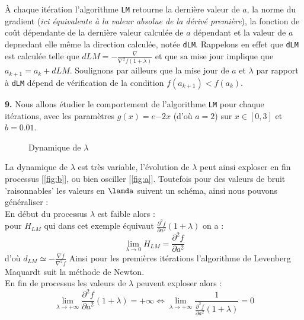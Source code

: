 \documentclass[12pt]{article}
\begin{document}
À chaque itération l'algorithme \verb|LM| retourne la dernière  valeur de  $a$, la norme du gradient (\textit{ici équivalente à la valeur absolue de la dérivé première}), la fonction de coût dépendante de la dernière valeur calculée de $a$ dépendant et la valeur de $a$ depnedant elle même la direction calculée, notée \verb|dLM|. Rappelons en effet que  \verb|dLM|  est calculée telle que $dLM = -\frac{\nabla}{\nabla^2 f (1 + \lambda)}$ et que sa mise jour implique que  $a_{k+1} = a_k +dLM$. Soulignons par ailleurs que la mise jour de $a$ et $\lambda$ par rapport à \verb|dLM| dépend de vérification  de la condition $f(a_{k+1}) < f(a_k)$.

\textbf{\color{brick}9.} Nous allons étudier le comportement de l'algorithme \verb|LM| pour chaque itérations, avec les paramètres $g(x)= e{-2x}$ (d'où $a=2$) sur $x \in [0,3]$ et $b=0.01$.

\begin{figure}
  \centering
  \caption{Dynamique de $\lambda$}
  \label{fig:ab}
\end{figure}




La dynamique de $\lambda$ est très variable, l'évolution de $\lambda$ peut ainsi exploser en fin processus [\ref{fig:b}], ou bien osciller  [\ref{fig:a}]. Toutefois pour des valeurs de bruit 'raisonnables' les valeurs en $\lamda$ suivent un schéma,  ainsi nous pouvons généraliser :\\
En début du processus $\lambda$ est faible alors :\\
pour $H_{LM}$ qui dans cet exemple équivaut $\frac{\partial^2 f}{\partial a^2}(1+\lambda)$ on a :
$$\lim_{\lambda\to 0} H_{LM} = \frac{\partial ^2f}{\partial a^2} $$
d'où $d_{LM} \simeq -\frac{\nabla f}{\nabla^2f}$
Ainsi pour les premières itérations l'algorithme de Levenberg Maquardt suit la méthode de Newton. \\
En fin de processus les valeurs de $\lambda$ peuvent exploser alors :
$$\lim_{\lambda\to +\infty} \frac{\partial ^2 f}{\partial a^2}(1+\lambda) = +\infty \Longleftrightarrow \lim_{\lambda\to +\infty} \frac{1}{\frac{\partial ^2 f}{\partial a^2}(1+\lambda)} = 0$$
\end{document}
